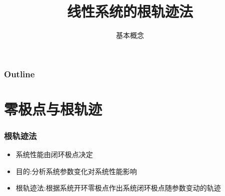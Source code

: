 \documentclass[table]{beamer}
\subtitle{基本概念}
\title{线性系统的根轨迹法}
\author{}
\date{}
\begin{document}
\maketitle

\begin{frame}
\frametitle{Outline}
\setcounter{tocdepth}{3}
\tableofcontents
\end{frame}















\section{零极点与根轨迹}
\label{sec-1}
\begin{frame}
\frametitle{根轨迹法}
\label{sec-1-1}

\begin{itemize}
\item <2->系统性能由闭环极点决定
\item <3->目的:分析系统参数变化对系统性能影响
\item <4->根轨迹法:根据系统开环零极点作出系统闭环极点随参数变动的轨迹
\end{itemize}
\end{frame}
\end{document}
